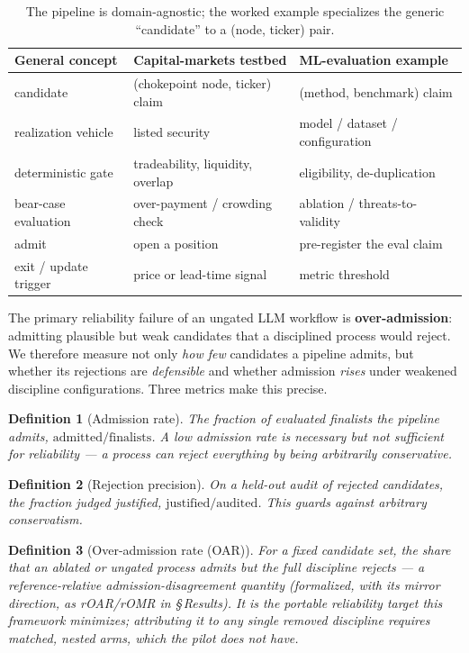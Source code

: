 \documentclass[11pt]{article}
\newtheorem{definition}{Definition}
\begin{document}
\begin{table}[h]
\centering
\small
\begin{tabularx}{\linewidth}{@{}lLL@{}}
\toprule
\textbf{General concept} & \textbf{Capital-markets testbed} & \textbf{ML-evaluation example} \\
\midrule
candidate & (chokepoint node, ticker) claim & (method, benchmark) claim \\
realization vehicle & listed security & model / dataset / configuration \\
deterministic gate & tradeability, liquidity, overlap & eligibility, de-duplication \\
bear-case evaluation & over-payment / crowding check & ablation / threats-to-validity \\
admit & open a position & pre-register the eval claim \\
exit / update trigger & price or lead-time signal & metric threshold \\
\bottomrule
\end{tabularx}
\caption{The pipeline is domain-agnostic; the worked example specializes the generic ``candidate'' to a (node, ticker) pair.}
\label{tab:candidate-map}
\end{table}

The primary reliability failure of an ungated LLM workflow is \textbf{over-admission}: admitting
plausible but weak candidates that a disciplined process would reject. We therefore measure not
only \emph{how few} candidates a pipeline admits, but whether its rejections are \emph{defensible}
and whether admission \emph{rises} under weakened discipline configurations. Three metrics make this
precise.

\begin{definition}[Admission rate]
The fraction of evaluated finalists the pipeline admits, $\text{admitted}/\text{finalists}$. A low
admission rate is necessary but not sufficient for reliability --- a process can reject everything by
being arbitrarily conservative.
\end{definition}

\begin{definition}[Rejection precision]
On a held-out audit of rejected candidates, the fraction judged \emph{justified},
$\text{justified}/\text{audited}$. This guards against arbitrary conservatism.
\end{definition}

\begin{definition}[Over-admission rate (OAR)]
For a fixed candidate set, the share that an ablated or ungated process \emph{admits} but the full
discipline \emph{rejects} --- a reference-relative admission-disagreement quantity (formalized,
with its mirror direction, as rOAR/rOMR in \S\,Results). It is the portable reliability target this
framework minimizes; attributing it to any \emph{single} removed discipline requires matched,
nested arms, which the pilot does not have.
\end{definition}
\end{document}
